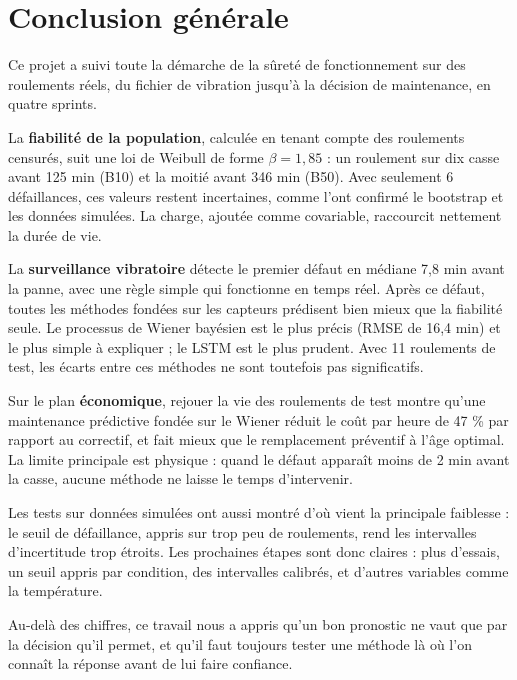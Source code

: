 \chapter*{Conclusion générale}

Ce projet a suivi toute la démarche de la sûreté de fonctionnement sur des roulements réels, du fichier de vibration jusqu'à la décision de maintenance, en quatre sprints.

La \textbf{fiabilité de la population}, calculée en tenant compte des roulements censurés, suit une loi de Weibull de forme $\beta = 1{,}85$ : un roulement sur dix casse avant 125 min (B10) et la moitié avant 346 min (B50). Avec seulement 6 défaillances, ces valeurs restent incertaines, comme l'ont confirmé le bootstrap et les données simulées. La charge, ajoutée comme covariable, raccourcit nettement la durée de vie.

La \textbf{surveillance vibratoire} détecte le premier défaut en médiane 7,8 min avant la panne, avec une règle simple qui fonctionne en temps réel. Après ce défaut, toutes les méthodes fondées sur les capteurs prédisent bien mieux que la fiabilité seule. Le processus de Wiener bayésien est le plus précis (RMSE de 16,4 min) et le plus simple à expliquer ; le LSTM est le plus prudent. Avec 11 roulements de test, les écarts entre ces méthodes ne sont toutefois pas significatifs.

Sur le plan \textbf{économique}, rejouer la vie des roulements de test montre qu'une maintenance prédictive fondée sur le Wiener réduit le coût par heure de 47 \% par rapport au correctif, et fait mieux que le remplacement préventif à l'âge optimal. La limite principale est physique : quand le défaut apparaît moins de 2 min avant la casse, aucune méthode ne laisse le temps d'intervenir.

Les tests sur données simulées ont aussi montré d'où vient la principale faiblesse : le seuil de défaillance, appris sur trop peu de roulements, rend les intervalles d'incertitude trop étroits. Les prochaines étapes sont donc claires : plus d'essais, un seuil appris par condition, des intervalles calibrés, et d'autres variables comme la température.

Au-delà des chiffres, ce travail nous a appris qu'un bon pronostic ne vaut que par la décision qu'il permet, et qu'il faut toujours tester une méthode là où l'on connaît la réponse avant de lui faire confiance.
